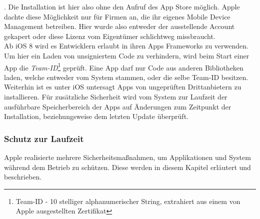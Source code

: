 		\cite{HeiseCheatApp2015}.
		Die Installation ist hier also ohne den Aufruf des
		App Store möglich. Apple dachte diese Möglichkeit nur für Firmen an, die ihr
		eigenes Mobile Device Management betreiben. Hier wurde also entweder der
		ausstellende Account gekapert oder diese Lizenz vom Eigentümer schlichtweg
		missbraucht.\\
		Ab iOS 8 wird es Entwicklern erlaubt in ihren Apps Frameworks zu verwenden. Um
		hier ein Laden von unsigniertem Code zu verhindern, wird beim Start einer App
		die \textsl{Team-ID}\footnote{Team-ID - 10 stelliger
		alphanumerischer String, extrahiert aus einem von Apple ausgestellten
		Zertifikat} geprüft. Eine App darf nur Code aus anderen Bibliotheken laden,
		welche entweder vom System stammen, oder die selbe Team-ID besitzen.
		Weiterhin ist es unter iOS untersagt Apps von ungeprüften Drittanbietern zu
		installieren. Für zusätzliche Sicherheit wird vom System zur
		Laufzeit der ausführbare Speicherbereich der Apps auf Änderungen zum
		Zeitpunkt der Installation, beziehungsweise dem letzten Update überprüft.
		
	\subsubsection{Schutz zur Laufzeit}
		Apple realisierte mehrere Sicherheitsmaßnahmen, um Applikationen und System
		während dem Betrieb zu schützen. Diese werden in diesem Kapitel erläutert und
		beschrieben.
		
